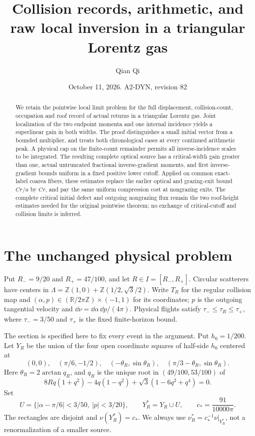 \documentclass[11pt,reqno]{amsart}
\title[Collision records and raw local inversion]{Collision records, arithmetic, and raw local inversion in a triangular Lorentz gas}
\author{Qian Qi}
\date{October 11, 2026. A2-DYN, revision 82}
\numberwithin{equation}{section}
\theoremstyle{definition}
\theoremstyle{remark}\newtheorem{remark}[theorem]{Remark}
\newcommand{\R}{\mathbb R}\newcommand{\Z}{\mathbb Z}
\begin{document}
\raggedbottom
\begin{abstract}
We retain the pointwise local limit problem for the full displacement,
collision-count, occupation and roof record of actual returns in a
triangular Lorentz gas. Joint localization of the two endpoint momenta
and one internal incidence yields a superlinear gain in both widths.
The proof distinguishes a small initial vector from a bounded
multiplier, and treats both chronological cases at every continued
arithmetic peak. A physical cap on the finite-count remainder permits
all inverse-incidence scales to be integrated. The resulting complete
optical source has a critical-width gain greater than one, actual
untruncated fractional inverse-gradient moments, and first
inverse-gradient bounds uniform in a fixed positive lower cutoff.
Applied on common exact-label coarea fibers, these estimates replace
the earlier optical and grazing-exit bound $Cr/a$ by $Cr$, and pay
the same uniform compression cost at nongrazing exits. The complete
critical initial defect and outgoing nongrazing flux remain the two
roof-height estimates needed for the original pointwise theorem;
no exchange of critical-cutoff and collision limits is inferred.
\end{abstract}
\maketitle

\section{The unchanged physical problem}
Put $R_-=9/20$ and $R_+=47/100$, and let $R\in I=[R_-,R_+]$. Circular scatterers have centers in
$\Lambda=\Z(1,0)+\Z(1/2,\sqrt3/2)$. Write $T_R$ for the regular
collision map and $(\alpha,p)\in(\R/2\pi\Z)\times(-1,1)$ for its
coordinates; $p$ is the outgoing tangential velocity and
$\dd\nu=\dd\alpha\,\dd p/(4\pi)$. Physical flights satisfy
$\tau_-\le\tau_R\le\tau_+$, where $\tau_-=3/50$ and $\tau_+$
is the fixed finite-horizon bound.

The section is specified here to fix every event in the argument.
Put $h_0=1/200$. Let $Y_R$ be the union of the four open coordinate
squares of half-side $h_0$ centered at
\[
 (0,0),\quad(\pi/6,-1/2),\quad
 (-\theta_R,\sin\theta_R),\quad
 (\pi/3-\theta_R,\sin\theta_R).
\]
Here $\theta_R=2\arctan q_R$, and $q_R$ is the unique root in
$(49/100,53/100)$ of
\[
 8Rq(1+q^2)-4q(1-q^2)+\sqrt3(1-6q^2+q^4)=0.
\]
Set
\[
 U=\{|\alpha-\pi/6|<3/50,\ |p|<3/20\},\qquad
 Y_R^*=Y_R\cup U,\qquad c_*=\frac{91}{10000\pi}.
\]
The rectangles are disjoint and $\nu(Y_R^*)=c_*$. We always use
$\nu_R^*=c_*^{-1}\nu|_{Y_R^*}$, not a renormalization of a smaller
source.
\end{document}
